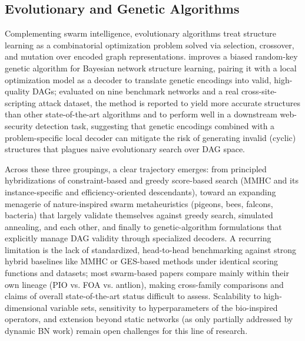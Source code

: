 \subsection{Evolutionary and Genetic Algorithms}
Complementing swarm intelligence, evolutionary algorithms treat structure learning as a combinatorial optimization problem solved via selection, crossover, and mutation over encoded graph representations. \cite{sun2022bayesian} improves a biased random-key genetic algorithm for Bayesian network structure learning, pairing it with a local optimization model as a decoder to translate genetic encodings into valid, high-quality DAGs; evaluated on nine benchmark networks and a real cross-site-scripting attack dataset, the method is reported to yield more accurate structures than other state-of-the-art algorithms and to perform well in a downstream web-security detection task, suggesting that genetic encodings combined with a problem-specific local decoder can mitigate the risk of generating invalid (cyclic) structures that plagues naive evolutionary search over DAG space.

Across these three groupings, a clear trajectory emerges: from principled hybridizations of constraint-based and greedy score-based search (MMHC and its instance-specific and efficiency-oriented descendants), toward an expanding menagerie of nature-inspired swarm metaheuristics (pigeons, bees, falcons, bacteria) that largely validate themselves against greedy search, simulated annealing, and each other, and finally to genetic-algorithm formulations that explicitly manage DAG validity through specialized decoders. A recurring limitation is the lack of standardized, head-to-head benchmarking against strong hybrid baselines like MMHC or GES-based methods under identical scoring functions and datasets; most swarm-based papers compare mainly within their own lineage (PIO vs. FOA vs. antlion), making cross-family comparisons and claims of overall state-of-the-art status difficult to assess. Scalability to high-dimensional variable sets, sensitivity to hyperparameters of the bio-inspired operators, and extension beyond static networks (as only partially addressed by dynamic BN work) remain open challenges for this line of research.

